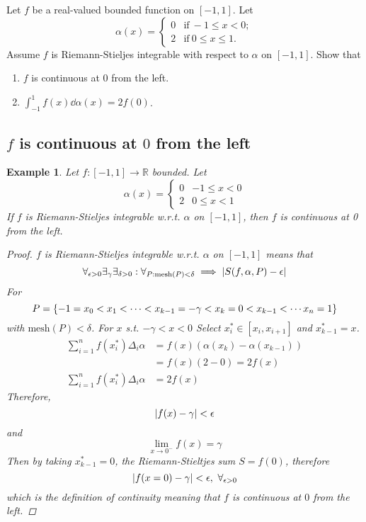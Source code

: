 \documentclass[]{article}
\newcommand{\R}{\mathbb{R}}
\newtheorem{example}{Example}
\begin{document}
\newpage
\section{}
Let $f$ be a real-valued bounded function on $[-1,1]$. 
Let\[
    \alpha(x) = \begin{cases}
        0 &\text{if} \ -1 \leq x < 0;\\
        2 &\text{if} \  0 \leq x \leq 1.
    \end{cases}
\]
Assume $f$ is Riemann-Stieljes integrable with respect to $\alpha$ on $[-1,1]$. 
Show that \begin{enumerate}
    \item $f$ is continuous at $0$ from the left.
    \item $\int_{-1}^{1} f(x) \dd{\alpha(x)} = 2 f(0)$.
\end{enumerate}

\subsection{$f$ is continuous at $0$ from the left}
\begin{example}
    Let $f : [-1, 1] \to \R$ bounded.
    Let \[
        \alpha(x) = \begin{cases}
            0   & -1 \leq x < 0\\
            2   &  0 \leq x < 1
        \end{cases}
    \] If $f$ is Riemann-Stieljes integrable w.r.t. $\alpha$ on $[-1,1]$, then $f$ is continuous at 0 from the left.
    \begin{proof}
        $f$ is Riemann-Stieljes integrable w.r.t. $\alpha$ on $[-1,1]$ means that \[
            \forall_{\epsilon > 0} \exists_{\gamma}  \exists_{\delta > 0} :
            \forall_{P : \text{mesh}(P) < \delta} \implies \abs{S(f, \alpha, P) - \epsilon}
        \] For \[
            P = \qty{-1 = x_0 < x_1 < \cdots < x_{k-1} = - \gamma < x_{k} = 0 < x_{k-1} < \cdots x_n = 1}
        \] with $\text{mesh}(P) < \delta$.
        For $x$ s.t. $- \gamma < x < 0$
        Select $x_i^* \in [x_{i}, x_{i+1}]$ and $x_{k-1}^* = x$. \begin{align*}
            \sum_{i=1}^{n} f(x_{i}^*) \Delta_i \alpha 
                &= f(x) (\alpha(x_k) - \alpha(x_{k-1}))\\
                &= f(x) (2 - 0) = 2 f(x)\\
            \sum_{i=1}^{n} f(x_{i}^*) \Delta_i \alpha 
                &= 2 f(x)
        \end{align*} Therefore, \[
            \abs{f(x) - \gamma} < \epsilon
        \] and \[
            \lim_{x \to 0^-} f(x) = \gamma
        \] Then by taking $x_{k-1}^* = 0$, the Riemann-Stieltjes sum $S = f(0)$, therefore \[
            \abs{f(x = 0) - \gamma} < \epsilon, \ \forall_{\epsilon > 0}
        \] which is the definition of continuity meaning that $f$ is continuous at $0$ from the left.
    \end{proof}
\end{example}
\end{document}
